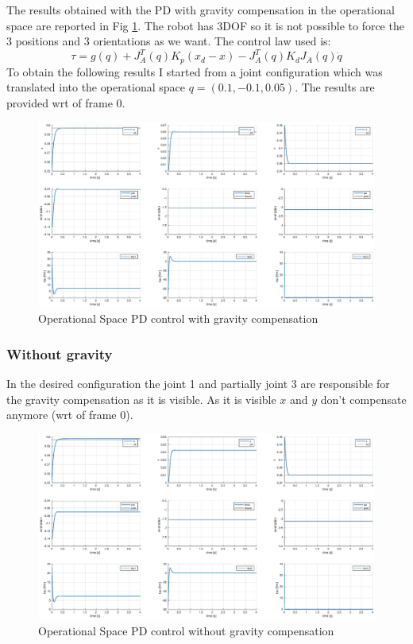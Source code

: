\documentclass[a4paper,12pt]{article}
\begin{document}
The results obtained with the PD with gravity compensation in the operational space are reported in Fig \ref{fig:gravity_op}. The robot has 3DOF so it is not possible to force the 3 positions and 3 orientations as we want. The control law used is:
\[
    \tau = g(q) + J_{A}^T(q)K_{p}(x_d -x) - J_{A}^T(q)K_dJ_{A}(q)\dot{q} 
\]
To obtain the following results I started from a joint configuration which was translated into the operational space $q = (0.1, -0.1, 0.05)$. The results are provided wrt of frame 0.
\begin{figure}[H]
    \begin{center}
        \hspace*{-4.5cm}
        \includegraphics[scale=0.5]{images/op_gravity.eps}
    \end{center}
    \caption{Operational Space PD control with gravity compensation}
    \label{fig:gravity_op}
\end{figure}

\subsubsection{Without gravity}

In the desired configuration the joint 1 and partially joint 3 are responsible for the gravity compensation as it is visible. As it is visible $x$ and $y$ don't compensate anymore (wrt of frame 0).

\begin{figure}[H]
    \begin{center}
        \hspace*{-4.5cm}
        \includegraphics[scale=0.5]{images/op_without_gravity.eps}
    \end{center}
    \caption{Operational Space PD control without gravity compensation}
    \label{fig:without_gravity_op}
\end{figure}
\end{document}
